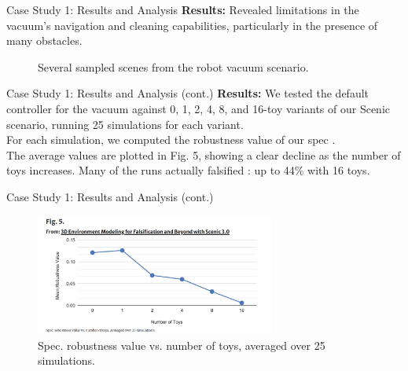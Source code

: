 \documentclass{beamer}
\begin{document}
\begin{frame}{Case Study 1: Results and Analysis}
\textbf{Results:} Revealed limitations in the vacuum's navigation and cleaning capabilities, particularly in the presence of many obstacles.
    \begin{figure}
        \centering
        \caption{Several sampled scenes from the robot vacuum scenario.}
        \label{fig:robot-vacuum}
    \end{figure}
\end{frame}

\begin{frame}  {Case Study 1: Results and Analysis (cont.)} 
\textbf{Results:} We tested the default controller for the vacuum against 0, 1, 2, 4, 8, and 16-toy variants of our Scenic scenario, running 25 simulations for each variant.\\For each simulation, we computed the robustness value of our spec 
.\\The average values are plotted in Fig. 5, showing a clear decline as the number of toys increases. Many of the runs actually falsified : up to 44\% with 16 toys.
\end{frame}
\begin{frame}  {Case Study 1: Results and Analysis (cont.)}
    \begin{figure}
        \centering
        \includegraphics[width=0.7\textwidth]{FIG5.png}
        \caption{Spec. robustness value vs. number of toys, averaged over 25 simulations.}
        \label{fig:case-study-1}
    \end{figure}
\end{frame}
\end{document}
